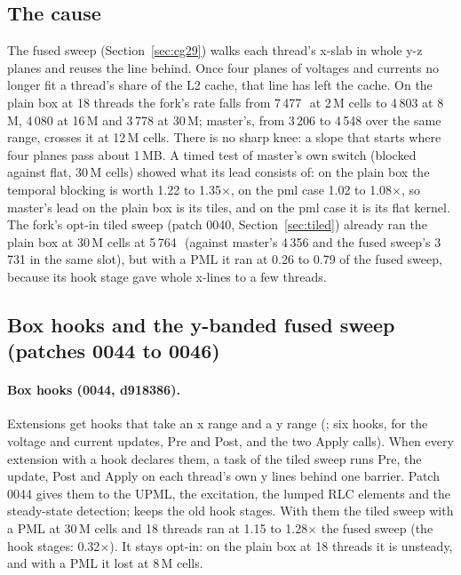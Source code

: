 \subsection{The cause}
The fused sweep (Section~\ref{sec:cg29}) walks each thread's x-slab in whole y-z planes and reuses the line behind. Once
four planes of voltages and currents no longer fit a thread's share of the L2 cache, that line has left the cache. On the
plain box at 18 threads the fork's rate falls from 7\,477\,\MC\ at 2\,M cells to 4\,803 at 8\,M, 4\,080 at 16\,M and 3\,778 at 30\,M;
master's, from 3\,206 to 4\,548 over the same range, crosses it at 12\,M cells. There is no sharp knee: a slope that
starts where four planes pass about 1\,MB. A timed test of master's own switch (blocked against flat, 30\,M cells) showed what its lead
consists of: on the plain box the temporal blocking is worth 1.22 to 1.35$\times$, on the pml case 1.02 to 1.08$\times$, so master's lead on the plain box
is its tiles, and on the pml case it is its flat kernel. The fork's opt-in tiled sweep (patch 0040, Section~\ref{sec:tiled}) already ran the
plain box at 30\,M cells at 5\,764\,\MC\ (against master's 4\,356 and the fused sweep's 3\,731 in the same slot), but
with a PML it ran at 0.26 to 0.79 of the fused sweep, because its hook stage gave whole x-lines to a few threads.

\subsection{Box hooks and the y-banded fused sweep (patches 0044 to 0046)}
\paragraph{Box hooks (0044, d918386).} Extensions get hooks that take an x range and a y range (; six
hooks, for the voltage and current updates, Pre and Post, and the two Apply calls). When every extension with a hook
declares them, a task of the tiled sweep runs Pre, the update, Post and Apply on each thread's own y lines behind one
barrier. Patch 0044 gives them to the UPML, the excitation, the lumped RLC elements and the steady-state detection;
 keeps the old hook stages. With them the tiled sweep with a PML at 30\,M cells and 18
threads ran at 1.15 to 1.28$\times$ the fused sweep (the hook stages: 0.32$\times$). It stays opt-in: on the plain box
at 18 threads it is unsteady, and with a
PML it lost at 8\,M cells.


